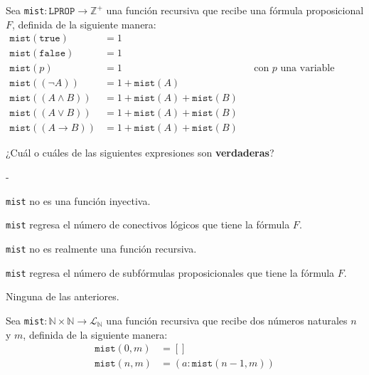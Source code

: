 \documentclass[12pt, a4paper]{exam}
\makeatletter
\renewenvironment{checkboxes}%
   {\setcounter{choice}{0}\list{\checkbox@char}%
      {%
        \settowidth{\leftmargin}{W.\hskip\labelsep\hskip 2.5em}%
        \def\choice{%
          \if@correctchoice
            \color@endgroup \endgroup
          \fi
          \stepcounter{choice}
          \item[\checked@char]
          \do@choice@pageinfo
        } %
        \def\CorrectChoice{%
          \if@correctchoice
            \color@endgroup \endgroup
          \fi
          \ifprintanswers
            \ifhmode \unskip\unskip\unvbox\voidb@x \fi
            \begingroup \color@begingroup \@correctchoicetrue
            \CorrectChoice@Emphasis
            \stepcounter{choice}
            \item[\checked@char]
          \else
            \stepcounter{choice}
            \item[\checked@char]
          \fi
          \do@choice@pageinfo
        } %
        \let\correctchoice\CorrectChoice
        \labelwidth\leftmargin\advance\labelwidth-\labelsep
        \topsep=0pt
        \partopsep=0pt
        \checkboxeshook
      }%
   }%
   {\if@correctchoice \color@endgroup \endgroup \fi \endlist}
\makeatother
\begin{document}
    \begin{questions}
        \question
        {
            Sea \texttt{mist}$: \texttt{LPROP} \rightarrow \mathbb{Z}^+$ una 
            función recursiva que recibe una fórmula proposicional $F$, definida 
            de la siguiente manera:
            \begin{align*}
                \texttt{mist}(\texttt{true}) &= 1 \\ 
                \texttt{mist}(\texttt{false}) &= 1 \\ 
                \texttt{mist}(p) &= 1
                && \text{con $p$ una variable proposicional} \\ 
                \texttt{mist}((\neg A)) &= 1 + \texttt{mist}(A) \\ 
                \texttt{mist}((A \land B)) &= 1 + \texttt{mist}(A) +
                \texttt{mist}(B) \\ 
                \texttt{mist}((A \lor B)) &= 1 + \texttt{mist}(A) +
                \texttt{mist}(B) \\ 
                \texttt{mist}((A \rightarrow B)) &= 1 + \texttt{mist}(A) +
                \texttt{mist}(B) 
            \end{align*}

            ¿Cuál o cuáles de las siguientes expresiones son \textbf{verdaderas}?
        }
        \begin{checkboxes}
            \choice \texttt{mist} no es una función inyectiva. %

            \choice \texttt{mist} regresa el número de conectivos lógicos que 
            tiene la fórmula $F$.

            \choice \texttt{mist} no es realmente una función recursiva. 

            \choice \texttt{mist} regresa el número de subfórmulas proposicionales
            que tiene la fórmula $F$. %
            
            \choice Ninguna de las anteriores. 
        \end{checkboxes}

        \question
        {
            Sea \texttt{mist}$: \mathbb{N} \times \mathbb{N} \rightarrow 
            \mathcal{L}_\mathbb{N}$ una función recursiva que recibe dos 
            números naturales $n$ y $m$, definida de la siguiente manera:
            \begin{align*}
                \texttt{mist}(0,m) &= [] \\ 
                \texttt{mist}(n, m) &= (a:\texttt{mist}(n-1,m))
            \end{align*}

}
\end{questions}
\end{document}
